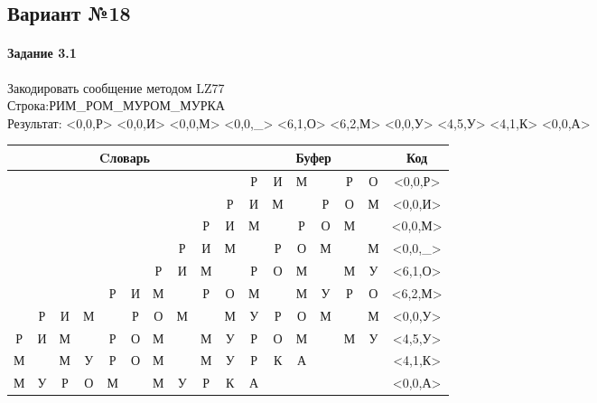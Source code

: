\documentclass[a4paper, 12pt]{article}
\begin{document}
\pagebreak
\subsection{Вариант №18}
\paragraph{Задание 3.1}

Закодировать сообщение методом LZ77\\
Строка:РИМ\_РОМ\_МУРОМ\_МУРКА\\
Результат: <0,0,Р> <0,0,И> <0,0,М> <0,0,\_> <6,1,О> <6,2,М> <0,0,У> <4,5,У> <4,1,К> <0,0,А>\\
\begin{table}[h!]
\centering
\begin{tabular}{|c|c|c|c|c|c|c|c|c|c|c|c|c|c|c|c|c|} 
\hline
\multicolumn{10}{|c|}{Cловарь} & \multicolumn{6}{c|}{Буфер} & Код  \\ \hline
  &   &   &   &   &   &   &   &   &   & \cellcolor[HTML]{8CE4F6} Р & И & М &   & Р & О & <0,0,Р>
\\ \hline
  &   &   &   &   &   &   &   &   & Р & \cellcolor[HTML]{8CE4F6} И & М &   & Р & О & М & <0,0,И>
\\ \hline
  &   &   &   &   &   &   &   & Р & И & \cellcolor[HTML]{8CE4F6} М &   & Р & О & М &   & <0,0,М>
\\ \hline
  &   &   &   &   &   &   & Р & И & М & \cellcolor[HTML]{8CE4F6}   & Р & О & М &   & М & <0,0,\_>
\\ \hline
  &   &   &   &   &   & \cellcolor[HTML]{FFFF00} Р & И & М &   & \cellcolor[HTML]{FFFF00} Р & \cellcolor[HTML]{8CE4F6} О & М &   & М & У & <6,1,О>
\\ \hline
  &   &   &   & Р & И & \cellcolor[HTML]{FFFF00} М & \cellcolor[HTML]{FFFF00}   & Р & О & \cellcolor[HTML]{FFFF00} М & \cellcolor[HTML]{FFFF00}   & \cellcolor[HTML]{8CE4F6} М & У & Р & О & <6,2,М>
\\ \hline
  & Р & И & М &   & Р & О & М &   & М & \cellcolor[HTML]{8CE4F6} У & Р & О & М &   & М & <0,0,У>
\\ \hline
Р & И & М &   & \cellcolor[HTML]{FFFF00} Р & \cellcolor[HTML]{FFFF00} О & \cellcolor[HTML]{FFFF00} М & \cellcolor[HTML]{FFFF00}   & \cellcolor[HTML]{FFFF00} М & У & \cellcolor[HTML]{FFFF00} Р & \cellcolor[HTML]{FFFF00} О & \cellcolor[HTML]{FFFF00} М & \cellcolor[HTML]{FFFF00}   & \cellcolor[HTML]{FFFF00} М & \cellcolor[HTML]{8CE4F6} У & <4,5,У>
\\ \hline
М &   & М & У & \cellcolor[HTML]{FFFF00} Р & О & М &   & М & У & \cellcolor[HTML]{FFFF00} Р & \cellcolor[HTML]{8CE4F6} К & А &   &   &   & <4,1,К>
\\ \hline
М & У & Р & О & М &   & М & У & Р & К & \cellcolor[HTML]{8CE4F6} А &   &   &   &   &   & <0,0,А>
\\ \hline
\end{tabular}
\end{table}
\end{document}
